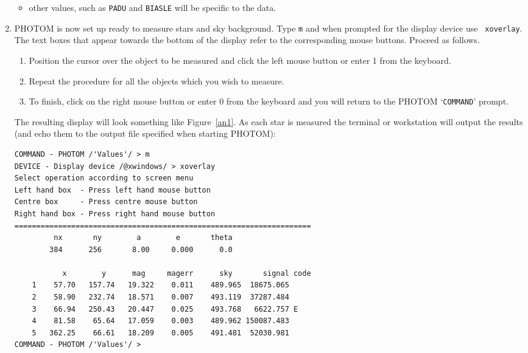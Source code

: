 \documentclass[twoside,11pt]{article}
\begin{document}
\begin{enumerate}
\begin{itemize}
    \item other values, such as {\tt PADU} and {\tt BIASLE} will be
     specific to the data.

  \end{itemize} 

  \item PHOTOM is now set up ready to measure stars and sky background.
   Type {\tt m} and when prompted for the display device use {\tt
   xoverlay}.  The text boxes that appear towards the bottom of the
   display refer to the corresponding mouse buttons.  Proceed as
   follows.

  \begin{enumerate}

    \item Position the cursor over the object to be measured and
     click the left mouse button or enter 1 from the keyboard.

    \item Repeat the procedure for all the objects which you wish
     to measure.

    \item To finish, click on the right mouse button or enter 0 from
     the keyboard and you will return to the PHOTOM `{\tt COMMAND}'
     prompt.

  \end{enumerate}

   The resulting display will look something like Figure~\ref{an1}.
   As each star is measured the terminal or workstation will output the
   results (and echo them to the output file specified when starting
   PHOTOM):

{\samepage
\begin{verbatim}
COMMAND - PHOTOM /'Values'/ > m
DEVICE - Display device /@xwindows/ > xoverlay
Select operation according to screen menu
Left hand box  - Press left hand mouse button
Centre box     - Press centre mouse button
Right hand box - Press right hand mouse button
====================================================================
         nx       ny        a        e       theta
        384      256       8.00     0.000      0.0

           x        y      mag     magerr      sky       signal code
    1    57.70   157.74   19.322    0.011    489.965  18675.065
    2    58.90   232.74   18.571    0.007    493.119  37287.484
    3    66.94   250.43   20.447    0.025    493.768   6622.757 E
    4    81.58    65.64   17.059    0.003    489.962 150087.483
    5   362.25    66.61   18.209    0.005    491.481  52030.981
COMMAND - PHOTOM /'Values'/ > 
\end{verbatim}
}


\end{enumerate}
\end{document}
